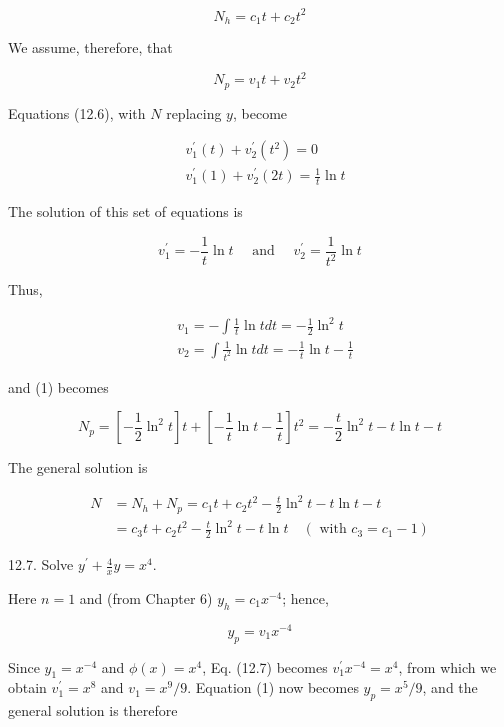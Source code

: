 \documentclass[10pt]{article}
\begin{document}
$$
N_{h}=c_{1} t+c_{2} t^{2}
$$

We assume, therefore, that


\begin{equation*}
N_{p}=v_{1} t+v_{2} t^{2} \tag{1}
\end{equation*}


Equations (12.6), with $N$ replacing $y$, become

$$
\begin{aligned}
& v_{1}^{\prime}(t)+v_{2}^{\prime}\left(t^{2}\right)=0 \\
& v_{1}^{\prime}(1)+v_{2}^{\prime}(2 t)=\frac{1}{t} \ln t
\end{aligned}
$$

The solution of this set of equations is

$$
v_{1}^{\prime}=-\frac{1}{t} \ln t \quad \text { and } \quad v_{2}^{\prime}=\frac{1}{t^{2}} \ln t
$$

Thus,

$$
\begin{aligned}
& v_{1}=-\int \frac{1}{t} \ln t d t=-\frac{1}{2} \ln ^{2} t \\
& v_{2}=\int \frac{1}{t^{2}} \ln t d t=-\frac{1}{t} \ln t-\frac{1}{t}
\end{aligned}
$$

and (1) becomes

$$
N_{p}=\left[-\frac{1}{2} \ln ^{2} t\right] t+\left[-\frac{1}{t} \ln t-\frac{1}{t}\right] t^{2}=-\frac{t}{2} \ln ^{2} t-t \ln t-t
$$

The general solution is

$$
\begin{aligned}
N & =N_{h}+N_{p}=c_{1} t+c_{2} t^{2}-\frac{t}{2} \ln ^{2} t-t \ln t-t \\
& =c_{3} t+c_{2} t^{2}-\frac{t}{2} \ln ^{2} t-t \ln t \quad\left(\text { with } c_{3}=c_{1}-1\right)
\end{aligned}
$$

12.7. Solve $y^{\prime}+\frac{4}{x} y=x^{4}$.

Here $n=1$ and (from Chapter 6) $y_{h}=c_{1} x^{-4}$; hence,


\begin{equation*}
y_{p}=v_{1} x^{-4} \tag{1}
\end{equation*}


Since $y_{1}=x^{-4}$ and $\phi(x)=x^{4}$, Eq. (12.7) becomes $v_{1}^{\prime} x^{-4}=x^{4}$, from which we obtain $v_{1}^{\prime}=x^{8}$ and $v_{1}=x^{9} / 9$. Equation (1) now becomes $y_{p}=x^{5} / 9$, and the general solution is therefore
\end{document}
